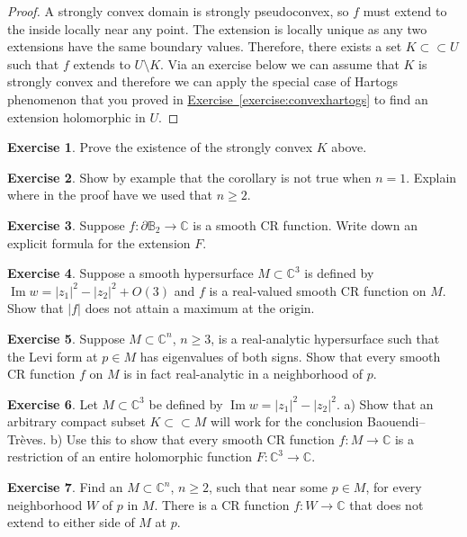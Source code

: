 \documentclass[12pt,openany]{book}
\renewcommand{\Im}{\operatorname{Im}}
\newcommand{\sabs}[1]{\lvert {#1} \rvert}
\newcommand{\C}{{\mathbb{C}}}
\newcommand{\bB}{{\mathbb{B}}}
\theoremstyle{plain}
\theoremstyle{remark}
\theoremstyle{definition}
\newenvironment{exbox}{%
    \def\FrameCommand{\vrule width 1pt \relax\hspace {10pt}}%
    \MakeFramed {\advance \hsize -\width \FrameRestore }%
}{%
    \endMakeFramed
}
\theoremstyle{exercise}
\newtheorem{exercise}{Exercise}[section]
\theoremstyle{example}
\newcommand{\exerciseref}[1]{\hyperref[#1]{Exercise~\ref*{#1}}}
\begin{document}
\begin{proof}
A strongly convex domain is strongly pseudoconvex, so $f$ must extend to the
inside locally near any point.  The extension is locally unique as any two
extensions have the same boundary values.  Therefore, there exists a set
$K \subset \subset U$ such that $f$ extends to $U \setminus K$.
Via an exercise below we can assume that $K$ is strongly convex and
therefore we can apply the special case of Hartogs phenomenon
that you proved in \exerciseref{exercise:convexhartogs} to find an
extension holomorphic in $U$.
\end{proof}

\begin{exbox}
\begin{exercise}
Prove the existence of the strongly convex $K$ above.
\end{exercise}

\begin{exercise}
Show by example that the corollary is not true when $n=1$.  Explain where in
the proof have we used that $n \geq 2$.
\end{exercise}

\begin{exercise}
Suppose $f \colon \partial \bB_2 \to \C$ is a smooth CR function.
Write down an explicit formula for the extension $F$.
\end{exercise}

\begin{exercise}
Suppose a smooth hypersurface $M \subset \C^3$ is defined by $\Im w = \sabs{z_1}^2-\sabs{z_2}^2 + O(3)$
and $f$ is a real-valued smooth CR function on $M$.  Show
that $\sabs{f}$ does not attain a maximum at the origin.
\end{exercise}

\begin{exercise}
Suppose $M \subset \C^n$, $n \geq 3$, is a real-analytic hypersurface
such that the Levi form at $p \in M$ has eigenvalues of both signs.
Show that every smooth CR function $f$ on $M$ is in fact real-analytic in
a neighborhood of $p$.
\end{exercise}

\begin{exercise}
Let $M \subset \C^3$ be defined by $\Im w = \sabs{z_1}^2-\sabs{z_2}^2$.
a) Show that an arbitrary compact subset $K \subset \subset M$ will work
for the conclusion Baouendi--Tr{\`e}ves.  b) Use this to show that every
smooth CR function $f \colon M \to \C$ is a restriction of an entire holomorphic function
$F \colon \C^3 \to \C$.
\end{exercise}

\begin{exercise}
Find an $M \subset \C^n$, $n \geq 2$, such that near some $p \in M$,
for every neighborhood $W$ of $p$ in $M$.  There is a CR function $f \colon
W \to \C$ that does not extend to either side of $M$ at $p$.
\end{exercise}
\end{exbox}
\end{document}
